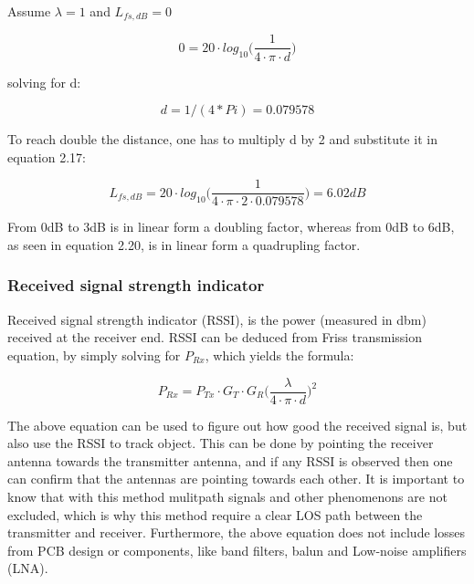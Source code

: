 Assume $\lambda = 1$ and $L_{fs,dB} = 0$

\begin{equation}
    0 = 20 \cdot log_{10}\Big(\frac{1}{4 \cdot \pi \cdot d}\Big)
\end{equation}

solving for d:

\begin{equation}
    d = 1/(4*Pi) = 0.079578
\end{equation}

To reach double the distance, one has to multiply d by 2 and substitute it in equation 2.17:

\begin{equation}
   L_{fs,dB} = 20 \cdot log_{10}\Big(\frac{1}{4 \cdot \pi \cdot 2 \cdot 0.079578}\Big) = 6.02dB 
\end{equation}

From 0dB to 3dB is in linear form a doubling factor, whereas from 0dB to 6dB, as seen in equation 2.20, is in linear form a quadrupling factor.


\subsubsection{Received signal strength indicator}
Received signal strength indicator (RSSI), is the power (measured in dbm) received at the receiver end. RSSI can be deduced from Friss transmission equation, by simply solving for $P_{Rx}$, which yields the formula:

\begin{equation}
    P_{Rx} = P_{Tx} \cdot G_T \cdot G_R \Big( \frac{\lambda}{4 \cdot \pi \cdot d} \Big)^2
\end{equation}

The above equation can be used to figure out how good the received signal is, but also use the RSSI to track object. This can be done by pointing the receiver antenna towards the transmitter antenna, and if any RSSI is observed then one can confirm that the antennas are pointing towards each other. It is important to know that with this method mulitpath signals and other phenomenons are not excluded, which is why this method require a clear LOS path between the transmitter and receiver. Furthermore, the above equation does not include losses from PCB design or components, like band filters, balun and Low-noise amplifiers (LNA).    

